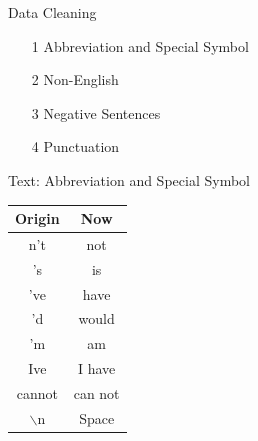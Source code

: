 \documentclass[10pt]{beamer}
\begin{document}
\begin{frame}{Data Cleaning}


\begin{itemize}

	\item[1] Abbreviation and Special Symbol

	\item[2] Non-English

	\item[3] Negative Sentences
	
	\item[4] Punctuation

\end{itemize}

\end{frame}



\begin{frame}{Text: Abbreviation and Special Symbol}

\begin{table}[ht]

\centering %
\begin{tabular}{c c} %
\hline %
Origin & Now \\ [0.5ex] %
\hline %
n't &   not\\  
's &   is\\  
've &   have\\  
'd &   would\\  
'm &   am\\  
Ive &  I have\\  
cannot &  can not\\
$\backslash$n & Space \\
\hline %
\end{tabular}
\label{table:nonlin} %
\end{table}
\end{frame}

\end{document}
